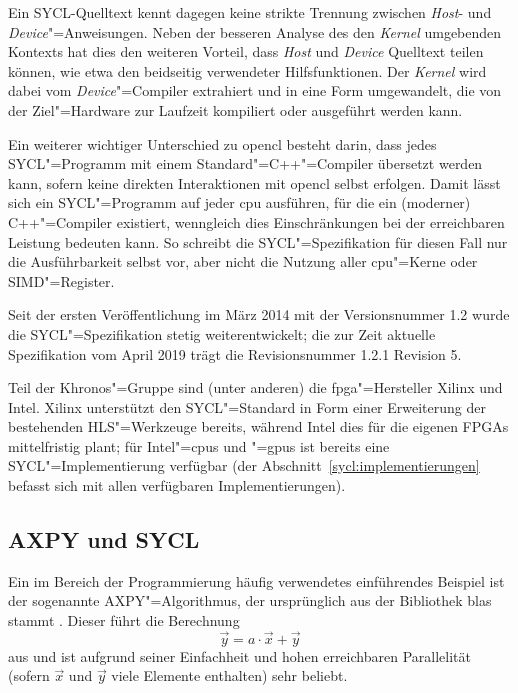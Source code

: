 Ein SYCL-Quelltext kennt dagegen keine strikte Trennung zwischen \textit{Host}-
und \textit{Device}"=Anweisungen. Neben der besseren Analyse des den
\textit{Kernel} umgebenden Kontexts hat dies den weiteren Vorteil, dass
\textit{Host} und \textit{Device} Quelltext teilen können, wie etwa den
beidseitig verwendeter Hilfsfunktionen. Der \textit{Kernel} wird dabei vom
\textit{Device}"=Compiler extrahiert und in eine Form umgewandelt, die von der
Ziel"=Hardware zur Laufzeit kompiliert oder ausgeführt werden kann.
\cite[vgl][35]{sycl2019}

Ein weiterer wichtiger Unterschied zu \gls{opencl} besteht darin, dass
jedes SYCL"=Programm mit einem Standard"=C++"=Compiler übersetzt werden kann,
sofern keine direkten Interaktionen mit \gls{opencl} selbst erfolgen. Damit
lässt sich ein SYCL"=Programm auf jeder \gls{cpu} ausführen, für die ein
(moderner) C++"=Compiler existiert, wenngleich dies Einschränkungen bei der
erreichbaren Leistung bedeuten kann. So schreibt die SYCL"=Spezifikation für
diesen Fall nur die Ausführbarkeit selbst vor, aber nicht die Nutzung aller
\gls{cpu}"=Kerne oder SIMD"=Register. \cite[vgl.][15]{sycl2019}

Seit der ersten Veröffentlichung im März 2014 \cite[vgl.][]{khronos2014} mit der
Versionsnummer 1.2 wurde die SYCL"=Spezifikation stetig weiterentwickelt; die
zur Zeit aktuelle Spezifikation vom April 2019 trägt die Revisionsnummer 1.2.1
Revision 5. \cite[vgl.][1]{sycl2019}

Teil der Khronos"=Gruppe sind (unter anderen) die \gls{fpga}"=Hersteller Xilinx
und Intel. Xilinx unterstützt den SYCL"=Standard in Form einer Erweiterung der
bestehenden HLS"=Werkzeuge bereits, während Intel dies für die eigenen FPGAs
mittelfristig plant; für Intel"=\gls{cpu}s und "=\gls{gpu}s ist bereits eine
SYCL"=Implementierung verfügbar (der Abschnitt~\ref{sycl:implementierungen}
befasst sich mit allen verfügbaren Implementierungen).

\subsection{AXPY und SYCL}\label{sycl:ueberblick:saxpy}

Ein im Bereich der Programmierung häufig verwendetes einführendes Beispiel
ist der sogenannte AXPY"=Algorithmus, der ursprünglich aus der Bibliothek
\gls{blas} stammt \cite[vgl.][]{lawson1979}. Dieser führt die Berechnung
\[\vec{y} = a \cdot \vec{x} + \vec{y}\]
aus und ist aufgrund seiner Einfachheit und hohen erreichbaren Parallelität
(sofern $\vec{x}$ und $\vec{y}$ viele Elemente enthalten) sehr beliebt.

